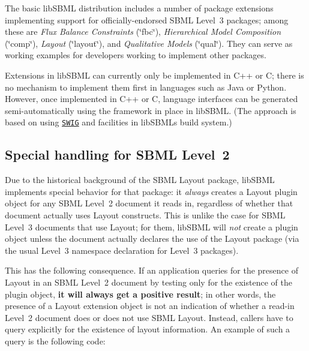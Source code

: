 The basic lib\+S\+B\+ML distribution includes a number of package extensions implementing support for officially-\/endorsed S\+B\+ML Level~3 packages; among these are {\itshape Flux Balance Constraints} (\char`\"{}fbc\char`\"{}), {\itshape Hierarchical Model Composition} (\char`\"{}comp\char`\"{}), {\itshape Layout} (\char`\"{}layout\char`\"{}), and {\itshape Qualitative Models} (\char`\"{}qual\char`\"{}). They can serve as working examples for developers working to implement other packages.

Extensions in lib\+S\+B\+ML can currently only be implemented in C++ or C; there is no mechanism to implement them first in languages such as Java or Python. However, once implemented in C++ or C, language interfaces can be generated semi-\/automatically using the framework in place in lib\+S\+B\+ML. (The approach is based on using \href{http://www.swig.org}{\tt S\+W\+IG} and facilities in lib\+S\+B\+ML\textquotesingle{}s build system.)\hypertarget{class_s_b_m_l_extension_sbmlextension-l2-special}{}\subsection{Special handling for S\+B\+M\+L Level 2}\label{class_s_b_m_l_extension_sbmlextension-l2-special}
\begin{DoxyParagraph}{}
Due to the historical background of the S\+B\+ML Layout package, lib\+S\+B\+ML implements special behavior for that package\+: it {\itshape always} creates a Layout plugin object for any S\+B\+ML Level~2 document it reads in, regardless of whether that document actually uses Layout constructs. This is unlike the case for S\+B\+ML Level~3 documents that use Layout; for them, lib\+S\+B\+ML will {\itshape not} create a plugin object unless the document actually declares the use of the Layout package (via the usual Level~3 namespace declaration for Level~3 packages).
\end{DoxyParagraph}
This has the following consequence. If an application queries for the presence of Layout in an S\+B\+ML Level~2 document by testing only for the existence of the plugin object, {\bfseries it will always get a positive result}; in other words, the presence of a Layout extension object is not an indication of whether a read-\/in Level~2 document does or does not use S\+B\+ML Layout. Instead, callers have to query explicitly for the existence of layout information. An example of such a query is the following code\+:

